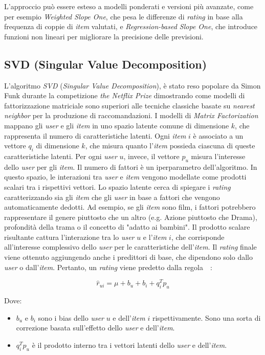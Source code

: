 L'approccio può essere esteso a modelli ponderati e versioni più avanzate, come per esempio \textit{Weighted Slope One}, che pesa le differenze di \textit{rating} in base alla frequenza di coppie di \textit{item} valutati, e \textit{Regression-based Slope One}, che introduce funzioni non lineari per migliorare la precisione delle previsioni.

\subsection{SVD (Singular Value Decomposition)}\label{svd}

L'algoritmo \textit{SVD} (\textit{Singular Value Decomposition}), è stato reso popolare da Simon Funk durante la competizione \textit{the Netflix Prize} dimostrando come modelli di fattorizzazione matriciale sono superiori alle tecniche classiche basate su \textit{nearest neighbor} per la produzione di raccomandazioni. I modelli di \textit{Matrix Factorization} mappano gli \textit{user} e gli \textit{item} in uno spazio latente comune di dimensione $k$, che rappresenta il numero di caratteristiche latenti. Ogni \textit{item} $i$ è associato a un vettore $q_i$ di dimensione $k$, che misura quanto l'\textit{item} possieda ciascuna di queste caratteristiche latenti. Per ogni \textit{user} $u$, invece, il vettore $p_u$ misura l'interesse dello \textit{user} per gli \textit{item}. Il numero di fattori è un iperparametro dell'algoritmo. In questo spazio, le interazioni tra \textit{user} e \textit{item} vengono modellate come prodotti scalari tra i rispettivi vettori. Lo spazio latente cerca di spiegare i \textit{rating} caratterizzando sia gli \textit{item} che gli \textit{user} in base a fattori che vengono automaticamente dedotti. Ad esempio, se gli \textit{item} sono film, i fattori potrebbero rappresentare il genere piuttosto che un altro (e.g. Azione piuttosto che Drama), profondità della trama o il concetto di "adatto ai bambini". Il prodotto scalare risultante cattura l'interazione tra lo \textit{user} $u$ e l'\textit{item} $i$, che corrisponde all'interesse complessivo dello \textit{user} per le caratteristiche dell'\textit{item}. Il \textit{rating} finale viene ottenuto aggiungendo anche i predittori di base, che dipendono solo dallo \textit{user} o dall'\textit{item}. Pertanto, un \textit{rating} viene predetto dalla regola~\cite{SVD_analysis}~\cite{Recommendation_book}:

\[
\hat{r}_{ui} = \mu + b_u + b_i + q_i^T p_u
\]

Dove:
\begin{itemize}
    \item $ b_u $ e $ b_i $ sono i bias dello \textit{user} $u$ e dell'\textit{item} $i$ rispettivamente. Sono una sorta di correzione basata sull'effetto dello \textit{user} e dell'\textit{item}.
    \item $ q_i^T p_u $ è il prodotto interno tra i vettori latenti dello \textit{user} e dell'\textit{item}.
\end{itemize}

